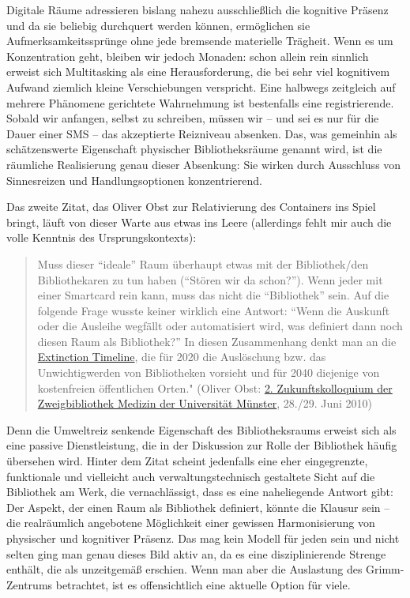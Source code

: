 \documentclass[output=paper]{langscibook}
\begin{document}
Digitale Räume adressieren bislang nahezu ausschließlich die kognitive
Präsenz und da sie beliebig durchquert werden können, ermöglichen sie
Aufmerksamkeitssprünge ohne jede bremsende materielle Trägheit. Wenn es
um Konzentration geht, bleiben wir jedoch Monaden: schon allein rein
sinnlich erweist sich Multitasking als eine Herausforderung, die bei
sehr viel kognitivem Aufwand ziemlich kleine Verschiebungen verspricht.
Eine halbwegs zeitgleich auf mehrere Phänomene gerichtete Wahrnehmung
ist bestenfalls eine registrierende. Sobald wir anfangen, selbst zu
schreiben, müssen wir -- und sei es nur für die Dauer einer SMS -- das
akzeptierte Reizniveau absenken. Das, was gemeinhin als schätzenswerte
Eigenschaft physischer Bibliotheksräume genannt wird, ist die räumliche
Realisierung genau dieser Absenkung: Sie wirken durch Ausschluss von
Sinnesreizen und Handlungsoptionen konzentrierend.

Das zweite Zitat, das Oliver Obst zur Relativierung des Containers ins
Spiel bringt, läuft von dieser Warte aus etwas ins Leere (allerdings
fehlt mir auch die volle Kenntnis des Ursprungskontexts):

\begin{quote}
Muss dieser \enquote{ideale} Raum überhaupt etwas mit der Bibliothek/den
Bibliothekaren zu tun haben (\enquote{Stören wir da schon?}). Wenn jeder
mit einer Smartcard rein kann, muss das nicht die \enquote{Bibliothek}
sein. Auf die folgende Frage wusste keiner wirklich eine Antwort:
\enquote{Wenn die Auskunft oder die Ausleihe wegfällt oder automatisiert
wird, was definiert dann noch diesen Raum als Bibliothek?} In diesen
Zusammenhang denkt man an die
\href{http://www.nowandnext.com/PDF/extinction_timeline.pdf}{Extinction
Timeline}, die für 2020 die Auslöschung bzw. das Unwichtigwerden von
Bibliotheken vorsieht und für 2040 diejenige von kostenfreien
öffentlichen Orten." (Oliver Obst:
\href{http://www.egms.de/static/de/journals/mbi/2010-10/mbi000214.shtml}{2.
Zukunftskolloquium der Zweigbibliothek Medizin der Universität Münster},
28./29. Juni 2010)
\end{quote}

Denn die Umweltreiz senkende Eigenschaft des Bibliotheksraums erweist
sich als eine passive Dienstleistung, die in der Diskussion zur Rolle
der Bibliothek häufig übersehen wird. Hinter dem Zitat scheint
jedenfalls eine eher eingegrenzte, funktionale und vielleicht auch
verwaltungstechnisch gestaltete Sicht auf die Bibliothek am Werk, die
vernachlässigt, dass es eine naheliegende Antwort gibt: Der Aspekt, der
einen Raum als Bibliothek definiert, könnte die Klausur sein -- die
realräumlich angebotene Möglichkeit einer gewissen Harmonisierung von
physischer und kognitiver Präsenz. Das mag kein Modell für jeden sein
und nicht selten ging man genau dieses Bild aktiv an, da es eine
disziplinierende Strenge enthält, die als unzeitgemäß erschien. Wenn man
aber die Auslastung des Grimm-Zentrums betrachtet, ist es offensichtlich
eine aktuelle Option für viele.
\end{document}
